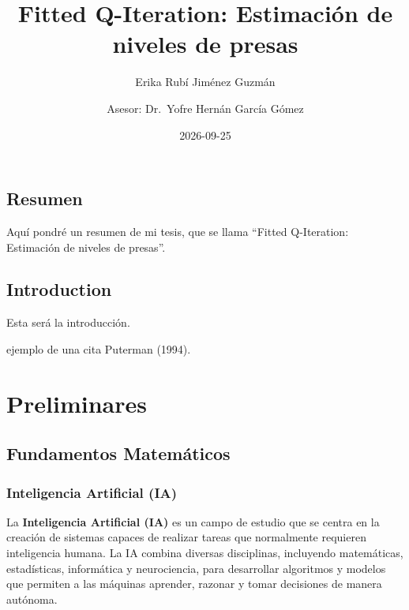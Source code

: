 \documentclass[
  letterpaper,
  DIV=11,
  numbers=noendperiod]{scrreprt}
\title{Fitted Q-Iteration: Estimación de niveles de presas}
\author{Erika Rubí Jiménez Guzmán \and Asesor: Dr.~Yofre Hernán García
Gómez}
\date{2026-09-25}
\renewcommand*\contentsname{Table of contents}
\newcommand\contentsname{Table of contents}
\theoremstyle{definition}
\theoremstyle{remark}
\begin{document}
\maketitle

\renewcommand*\contentsname{Table of contents}
{
\setcounter{tocdepth}{2}
\tableofcontents
}


\chapter*{Resumen}\label{resumen}


Aquí pondré un resumen de mi tesis, que se llama ``Fitted Q-Iteration:
Estimación de niveles de presas''.


\chapter*{Introduction}\label{introduction}


Esta será la introducción.

ejemplo de una cita Puterman (1994).

\part{Preliminares}

\chapter{Fundamentos Matemáticos}\label{fundamentos-matemuxe1ticos}

\section{Inteligencia Artificial (IA)}\label{inteligencia-artificial-ia}

La \textbf{Inteligencia Artificial (IA)} es un campo de estudio que se
centra en la creación de sistemas capaces de realizar tareas que
normalmente requieren inteligencia humana. La IA combina diversas
disciplinas, incluyendo matemáticas, estadísticas, informática y
neurociencia, para desarrollar algoritmos y modelos que permiten a las
máquinas aprender, razonar y tomar decisiones de manera autónoma.
\end{document}
